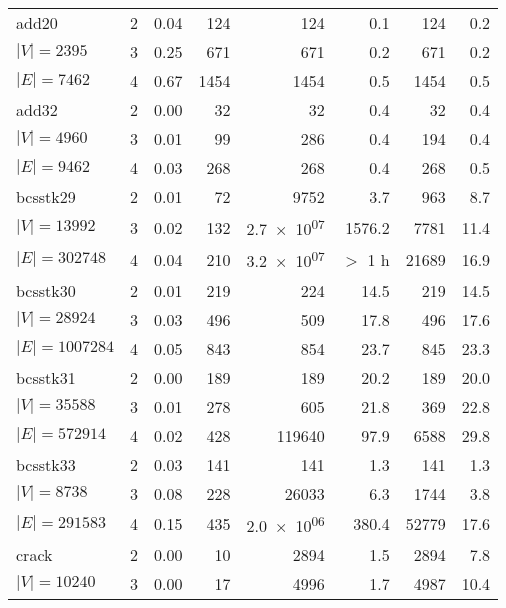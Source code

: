 \documentclass[letterpaper]{article}
\begin{document}
\begin{table}
\begin{tabular}{l c rr rr rr}
add20  & 2&0.04&124&124&0.1&124&0.2\\
\hspace*{0.2em}\color{gray}$|V|{=}2395$& 3&0.25&671&671&0.2&671&0.2\\
\hspace*{0.2em}\color{gray}$|E|{=}7462$& 4&0.67&1454&1454&0.5&1454&0.5\\
add32  & 2&0.00&32&32&0.4&32&0.4\\
\hspace*{0.2em}\color{gray}$|V|{=}4960$& 3&0.01&99&286&0.4&194&0.4\\
\hspace*{0.2em}\color{gray}$|E|{=}9462$& 4&0.03&268&268&0.4&268&0.5\\
bcsstk29  & 2&0.01&72&9752&3.7&963&8.7\\
\hspace*{0.2em}\color{gray}$|V|{=}13992$& 3&0.02&132&\num{2.7e+07}&1576.2&7781&11.4\\
\hspace*{0.2em}\color{gray}$|E|{=}302748$& 4&0.04&210&\color{gray}\num{3.2e+07}&\color{gray}$>$ 1 h&21689&16.9\\
bcsstk30  & 2&0.01&219&224&14.5&219&14.5\\
\hspace*{0.2em}\color{gray}$|V|{=}28924$& 3&0.03&496&509&17.8&496&17.6\\
\hspace*{0.2em}\color{gray}$|E|{=}1007284$& 4&0.05&843&854&23.7&845&23.3\\
bcsstk31  & 2&0.00&189&189&20.2&189&20.0\\
\hspace*{0.2em}\color{gray}$|V|{=}35588$& 3&0.01&278&605&21.8&369&22.8\\
\hspace*{0.2em}\color{gray}$|E|{=}572914$& 4&0.02&428&119640&97.9&6588&29.8\\
bcsstk33  & 2&0.03&141&141&1.3&141&1.3\\
\hspace*{0.2em}\color{gray}$|V|{=}8738$& 3&0.08&228&26033&6.3&1744&3.8\\
\hspace*{0.2em}\color{gray}$|E|{=}291583$& 4&0.15&435&\num{2.0e+06}&380.4&52779&17.6\\
crack  & 2&0.00&10&2894&1.5&2894&7.8\\
\hspace*{0.2em}\color{gray}$|V|{=}10240$& 3&0.00&17&4996&1.7&4987&10.4\\

\end{tabular}
\end{table}
\end{document}
